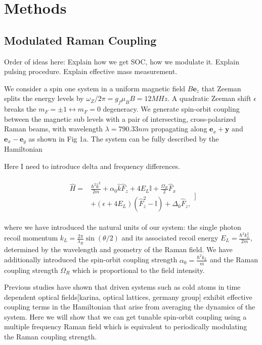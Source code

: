 \section{Methods}

 
\subsection{Modulated Raman Coupling}

Order of ideas here:
Explain how we get SOC, how we modulate it.
Explain pulsing procedure.
Explain effective mass measurement. 





We consider a spin one system in a uniform magnetic field  $B\mathbf{e}_z$ that Zeeman splits the energy levels by $\omega_Z/2\pi=g_f\mu_BB = 12 MHz$. A quadratic Zeeman shift $\epsilon$ breaks the $m_F=\pm1\leftrightarrow m_F=0$ degeneracy. We generate spin-orbit coupling between the magnetic sub levels with a pair of intersecting, cross-polarized Raman beams, with wavelength $\lambda=790.33 nm$ propagating along $\mathbf{e}_x+\mathbf{y}$ and $\mathbf{e}_x-\mathbf{e}_y$ as shown in Fig 1a. The system can be fully described by the Hamiltonian

Here I need to introduce delta and frequency differences. 

\begin{align}
	\begin{split}
		\hat{H} = &\frac{\hbar^2\hat{k}^2}{2m} + \alpha_0\hat{k}\hat{F}_z +4E_L\mathbb{I} + \frac{\Omega_R}{2}\hat{F}_x\\
		& +(\epsilon+4E_L)(\hat{F}_z^2-\mathbb{I}) +\Delta_0\hat{F}_z, 
		\label{Eq:SOCone}
	\end{split}]
\end{align}	


where we have introduced the natural units of our system: the single photon recoil momentum $k_L=\frac{2\pi}{\lambda_R}\sin(\theta/2)$ and its associated recoil energy $E_L=\frac{\hbar^2k_L^2}{2m}$, determined by the wavelength and geometry of the Raman field. We have additionally introduced the spin-orbit coupling strength $\alpha_0=\frac{\hbar^2k_L}{m}$ and the Raman coupling strength $\Omega_R$ which is proportional to the field intensity. 

Previous studies have shown that driven systems such as cold atoms in time dependent optical fields[karina, optical lattices, germany group] exhibit effective coupling terms in the Hamiltonian that arise from averaging the dynamics of the system. Here we will show that we can get tunable spin-orbit coupling using a multiple frequency Raman field which is equivalent to periodically modulating the Raman coupling strength.

